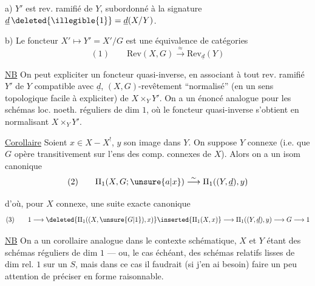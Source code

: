 
a) $Y'$ est   rev. ramifié de $Y$, subordonné à la signature $\underline d\,\deleted{\illegible{1}}=\underline d(X/Y)$.

b) Le foncteur $X'\longmapsto Y'=X'/G$ est une équivalence de catégories
\[
(1)\qquad \mathrm{Rev}(X,G)\overset{\approx}{\longrightarrow}\mathrm{Rev}_{\underline d}(Y)
\]

\uline{NB} On peut expliciter un foncteur quasi-inverse, en associant à tout rev. ramifié $Y'$ de $Y$ compatible avec $\underline d$,   $(X,G)$-revêtement ``normalisé'' (en un sens topologique facile à expliciter) de $X\times_Y Y'$. On a un énoncé analogue pour les schémas loc. noeth. réguliers de dim $1$, où le foncteur quasi-inverse s'obtient en normalisant $X\times_Y Y'$.

\uline{Corollaire} Soient $x\in X-X^{!}$, $y$ son image dans $Y$. On suppose $Y$ connexe (i.e. que $G$ opère transitivement sur l'ens des comp. connexes de $X$). Alors on a un isom canonique
\[
(2)\qquad \Pi_1(X,G;\unsure{a|x})\overset{\sim}{\longrightarrow}\Pi_1((Y,\underline d),y)
\]


d'où, pour $X$ connexe, une suite exacte canonique
\[
(3)\qquad
1\longrightarrow
\deleted{\Pi_1((X,\unsure{G|1}),x)}\inserted{\Pi_1(X,x)}
\longrightarrow\Pi_1((Y,\underline d),y)\longrightarrow G\longrightarrow 1
\]

\uline{NB} On a  un corollaire analogue dans le contexte schématique, $X$ et $Y$ étant des schémas réguliers de dim $1$ --- ou, le cas échéant, des schémas relatifs lisses de dim rel. $1$ sur un $S$, mais dans ce cas il faudrait (si j'en ai besoin) faire un peu attention de préciser  en forme raisonnable.

